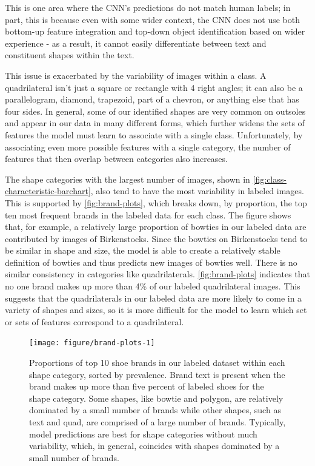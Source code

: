 \documentclass{article}\usepackage[]{graphicx}\usepackage[table]{xcolor}
\newenvironment{knitrout}{}{} %
\begin{document}
This is one area where the CNN's predictions do not match human labels; in part, this is because even with some wider context, the CNN does not use both bottom-up feature integration and top-down object identification based on wider experience - as a result, it cannot easily differentiate between text and constituent shapes within the text.

This issue is exacerbated by the variability of images within a class. A quadrilateral isn't just a square or rectangle with 4 right angles; it can also be a parallelogram, diamond, trapezoid, part of a chevron, or anything else that has four sides. In general, some of our identified shapes are very common on outsoles and appear in our data in many different forms, which further widens the sets of features the model must learn to associate with a single class. Unfortunately, by associating even more possible features with a single category, the number of features that then overlap between categories also increases.

The shape categories with the largest number of images, shown in \autoref{fig:class-characteristic-barchart}, also tend to have the most variability in labeled images. This is supported by \autoref{fig:brand-plots}, which breaks down, by proportion, the top ten most frequent brands in the labeled data for each class. The figure shows that, for example, a relatively large proportion of bowties in our labeled data are contributed by images of Birkenstocks. Since the bowties on Birkenstocks tend to be similar in shape and size, the model is able to create a relatively stable definition of bowties and thus predicts new images of bowties well. There is no similar consistency in categories like quadrilaterals. \autoref{fig:brand-plots} indicates that no one brand makes up more than 4\% of our labeled quadrilateral images. This suggests that the quadrilaterals in our labeled data are more likely to come in a variety of shapes and sizes, so it is more difficult for the model to learn which set or sets of features correspond to a quadrilateral.

\begin{knitrout}
\color{fgcolor}\begin{figure}

{\centering \texttt{[image: figure/brand-plots-1]}

}

\caption[Proportions of top 10 shoe brands in our labeled dataset within each shape category, sorted by prevalence]{Proportions of top 10 shoe brands in our labeled dataset within each shape category, sorted by prevalence. Brand text is present when the brand makes up more than five percent of labeled shoes for the shape category. Some shapes, like bowtie and polygon, are relatively dominated by a small number of brands while other shapes, such as text and quad, are comprised of a large number of brands. Typically, model predictions are best for shape categories without much variability, which, in general, coincides with shapes dominated by a small number of brands.}\label{fig:brand-plots}
\end{figure}


\end{knitrout}
\end{document}
